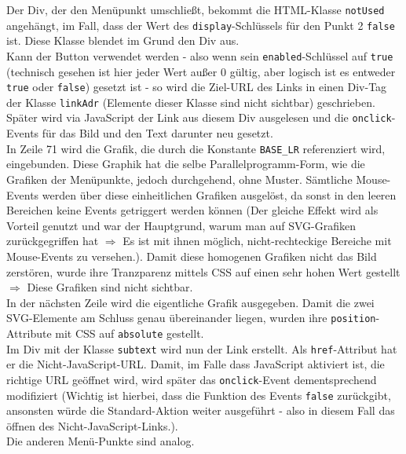 \newpage


Der Div, der den Menüpunkt umschließt, bekommt die HTML-Klasse \texttt{notUsed} angehängt, im Fall, dass der Wert des \texttt{display}-Schlüssels für den Punkt 2 \texttt{false} ist. Diese Klasse blendet im Grund den Div aus.\\
Kann der Button verwendet werden - also wenn sein \texttt{enabled}-Schlüssel auf \texttt{true} (technisch gesehen ist hier jeder Wert außer 0 gültig, aber logisch ist es entweder \texttt{true} oder \texttt{false}) gesetzt ist - so wird die Ziel-URL des Links in einen Div-Tag der Klasse \texttt{linkAdr} (Elemente dieser Klasse sind nicht sichtbar) geschrieben. Später wird via JavaScript der Link aus diesem Div ausgelesen und die \texttt{onclick}-Events für das Bild und den Text darunter neu gesetzt.\\
In Zeile 71 wird die Grafik, die durch die Konstante \texttt{BASE\_LR} referenziert wird, eingebunden. Diese Graphik hat die selbe Parallelprogramm-Form, wie die Grafiken der Menüpunkte, jedoch durchgehend, ohne Muster. Sämtliche Mouse-Events werden über diese einheitlichen Grafiken ausgelöst, da sonst in den leeren Bereichen keine Events getriggert werden können (Der gleiche Effekt wird als Vorteil genutzt und war der Hauptgrund, warum man auf SVG-Grafiken zurückgegriffen hat $ \Longrightarrow $ Es ist mit ihnen möglich, nicht-rechteckige Bereiche mit Mouse-Events zu versehen.). Damit diese homogenen Grafiken nicht das Bild zerstören, wurde ihre Tranzparenz mittels CSS auf einen sehr hohen Wert gestellt $ \Longrightarrow $ Diese Grafiken sind nicht sichtbar.\\
In der nächsten Zeile wird die eigentliche Grafik ausgegeben. Damit die zwei SVG-Elemente am Schluss genau übereinander liegen, wurden ihre \texttt{position}-Attribute mit CSS auf \texttt{absolute} gestellt.\\
Im Div mit der Klasse \texttt{subtext} wird nun der Link erstellt. Als \texttt{href}-Attribut hat er die Nicht-JavaScript-URL. Damit, im Falle dass JavaScript aktiviert ist, die richtige URL geöffnet wird, wird später das \texttt{onclick}-Event dementsprechend modifiziert (Wichtig ist hierbei, dass die Funktion des Events \texttt{false} zurückgibt, ansonsten würde die Standard-Aktion weiter ausgeführt - also in diesem Fall das öffnen des Nicht-JavaScript-Links.).\\
Die anderen Menü-Punkte sind analog.\\
